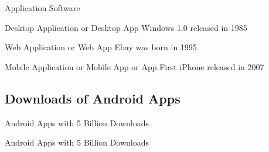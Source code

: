 \begin{frame}{Application Software}
	\begin{fancycolumns}[T,widths={46}]
		\begin{example}{Desktop Application or Desktop App}
			Windows 1.0 released in 1985
		\end{example}
	\nextcolumn
		\begin{example}{Web Application or Web App}
			Ebay was born in 1995
		\end{example}
		\hfill\pause
		\begin{example}{Mobile Application or Mobile App or App}
			First iPhone released in 2007
		\end{example}
	\end{fancycolumns}
\end{frame}


\subsection{Downloads of Android Apps}
\begin{frame}{Android Apps with 5 Billion Downloads }
	\centering{}
\end{frame}

\begin{frame}{Android Apps with 5 Billion Downloads }
	\centering{}
\end{frame}

